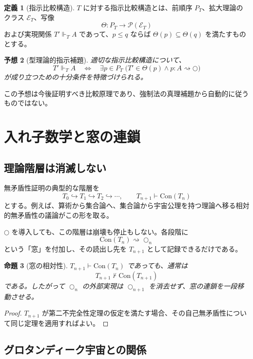 \documentclass[a4paper,11pt]{ltjsarticle}
\theoremstyle{definition}
\newtheorem{definition}{定義}[section]
\theoremstyle{plain}
\newtheorem{proposition}[definition]{命題}
\newtheorem{conjecture}[definition]{予想}
\newcommand{\dfix}{\bigcirc}
\newcommand{\Con}{\mathrm{Con}}
\begin{document}
\begin{definition}[指示比較構造]
$T$ に対する指示比較構造とは、前順序 $P_T$、拡大理論のクラス $\mathcal{E}_T$、写像
\[
 \Theta:P_T\longrightarrow\mathcal{P}(\mathcal{E}_T)
\]
および実現関係 $T'\Vdash_T A$ であって、$p\le q$ ならば $\Theta(p)\subseteq\Theta(q)$ を満たすものとする。
\end{definition}

\begin{conjecture}[型理論的指示補題]
適切な指示比較構造について、
\[
 T'\Vdash_T A
 \quad\Longleftrightarrow\quad
 \exists p\in P_T\;
 \bigl(T'\in\Theta(p)\land p:A\rightsquigarrow\dfix\bigr)
\]
が成り立つための十分条件を特徴づけられる。
\end{conjecture}

この予想は今後証明すべき比較原理であり、強制法の真理補題から自動的に従うものではない。

\section{入れ子数学と窓の連鎖}

\subsection{理論階層は消滅しない}

無矛盾性証明の典型的な階層を
\[
 T_0\hookrightarrow T_1\hookrightarrow T_2\hookrightarrow\cdots,
 \qquad
 T_{n+1}\vdash\Con(T_n)
\]
とする。例えば、算術から集合論へ、集合論から宇宙公理を持つ理論へ移る相対的無矛盾性の議論がこの形を取る。

$\dfix$ を導入しても、この階層は崩壊も停止もしない。各段階に
\[
 \Con(T_n)\rightsquigarrow\dfix_n
\]
という「窓」を付加し、その読出し先を $T_{n+1}$ として記録できるだけである。

\begin{proposition}[窓の相対性]
$T_{n+1}\vdash\Con(T_n)$ であっても、通常は
\[
 T_{n+1}\nvdash\Con(T_{n+1})
\]
である。したがって $\dfix_n$ の外部実現は $\dfix_{n+1}$ を消去せず、窓の連鎖を一段移動させる。
\end{proposition}

\begin{proof}
$T_{n+1}$ が第二不完全性定理の仮定を満たす場合、その自己無矛盾性について同じ定理を適用すればよい。
\end{proof}

\subsection{グロタンディーク宇宙との関係}
\end{document}
